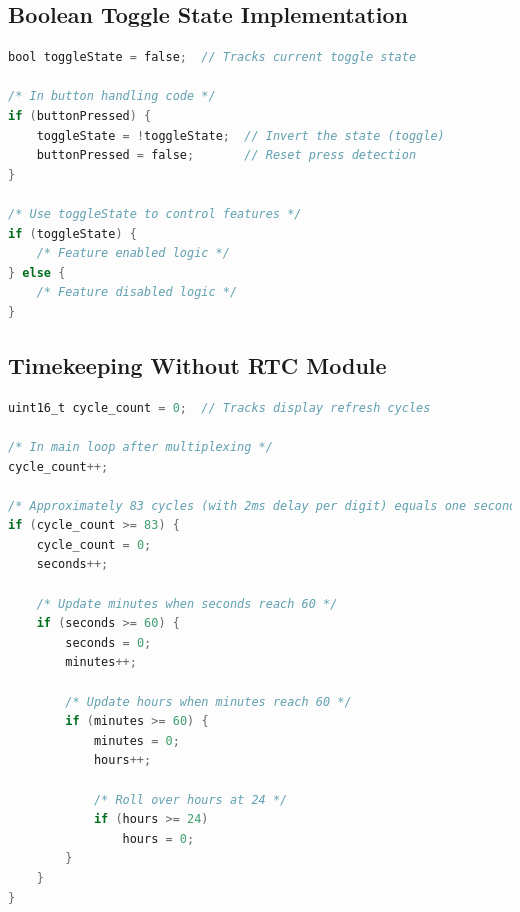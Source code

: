 \documentclass{article}
\begin{document}
\subsection{Boolean Toggle State Implementation}
\begin{lstlisting}[language=C]
bool toggleState = false;  // Tracks current toggle state

/* In button handling code */
if (buttonPressed) {
    toggleState = !toggleState;  // Invert the state (toggle)
    buttonPressed = false;       // Reset press detection
}

/* Use toggleState to control features */
if (toggleState) {
    /* Feature enabled logic */
} else {
    /* Feature disabled logic */
}
\end{lstlisting}

\subsection{Timekeeping Without RTC Module}
\begin{lstlisting}[language=C]
uint16_t cycle_count = 0;  // Tracks display refresh cycles

/* In main loop after multiplexing */
cycle_count++;

/* Approximately 83 cycles (with 2ms delay per digit) equals one second */
if (cycle_count >= 83) {
    cycle_count = 0;
    seconds++;
    
    /* Update minutes when seconds reach 60 */
    if (seconds >= 60) {
        seconds = 0;
        minutes++;
        
        /* Update hours when minutes reach 60 */
        if (minutes >= 60) {
            minutes = 0;
            hours++;
            
            /* Roll over hours at 24 */
            if (hours >= 24)
                hours = 0;
        }
    }
}
\end{lstlisting}
\end{document}

